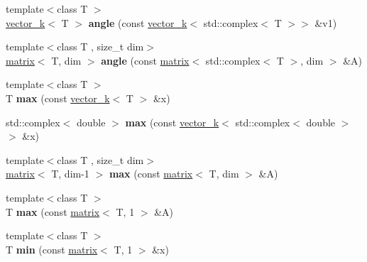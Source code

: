 \begin{DoxyCompactItemize}
\item 
\hypertarget{namespacekeycpp_ab4fe7e0308538622ae7d0b3a45182e0b}{{\footnotesize template$<$class T $>$ }\\\hyperlink{classkeycpp_1_1vector__k}{vector\-\_\-k}$<$ T $>$ {\bfseries angle} (const \hyperlink{classkeycpp_1_1vector__k}{vector\-\_\-k}$<$ std\-::complex$<$ T $>$$>$ \&v1)}\label{namespacekeycpp_ab4fe7e0308538622ae7d0b3a45182e0b}

\item 
\hypertarget{namespacekeycpp_afbbe373666d686c14e6ce6517d050373}{{\footnotesize template$<$class T , size\-\_\-t dim$>$ }\\\hyperlink{classkeycpp_1_1matrix}{matrix}$<$ T, dim $>$ {\bfseries angle} (const \hyperlink{classkeycpp_1_1matrix}{matrix}$<$ std\-::complex$<$ T $>$, dim $>$ \&A)}\label{namespacekeycpp_afbbe373666d686c14e6ce6517d050373}

\item 
\hypertarget{namespacekeycpp_a5a9aef54bbe0cd6e85d9a41842a57f05}{{\footnotesize template$<$class T $>$ }\\T {\bfseries max} (const \hyperlink{classkeycpp_1_1vector__k}{vector\-\_\-k}$<$ T $>$ \&x)}\label{namespacekeycpp_a5a9aef54bbe0cd6e85d9a41842a57f05}

\item 
\hypertarget{namespacekeycpp_a61e3069eeec7219d10f997367701e488}{std\-::complex$<$ double $>$ {\bfseries max} (const \hyperlink{classkeycpp_1_1vector__k}{vector\-\_\-k}$<$ std\-::complex$<$ double $>$ $>$ \&x)}\label{namespacekeycpp_a61e3069eeec7219d10f997367701e488}

\item 
\hypertarget{namespacekeycpp_abfa0ebe44ce33d380a100f6db8232a2d}{{\footnotesize template$<$class T , size\-\_\-t dim$>$ }\\\hyperlink{classkeycpp_1_1matrix}{matrix}$<$ T, dim-\/1 $>$ {\bfseries max} (const \hyperlink{classkeycpp_1_1matrix}{matrix}$<$ T, dim $>$ \&A)}\label{namespacekeycpp_abfa0ebe44ce33d380a100f6db8232a2d}

\item 
\hypertarget{namespacekeycpp_aa5f79e58739abeaa5e3f7d5c422cc409}{{\footnotesize template$<$class T $>$ }\\T {\bfseries max} (const \hyperlink{classkeycpp_1_1matrix}{matrix}$<$ T, 1 $>$ \&A)}\label{namespacekeycpp_aa5f79e58739abeaa5e3f7d5c422cc409}

\item 
\hypertarget{namespacekeycpp_a9d3aca14baf0d8e395876f286c284bcf}{{\footnotesize template$<$class T $>$ }\\T {\bfseries min} (const \hyperlink{classkeycpp_1_1matrix}{matrix}$<$ T, 1 $>$ \&x)}\label{namespacekeycpp_a9d3aca14baf0d8e395876f286c284bcf}


\end{DoxyCompactItemize}
